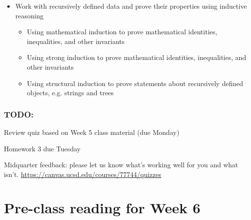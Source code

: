 \documentclass[12pt, oneside]{article}
\begin{document}
\begin{itemize}
\item Work with recursively defined data and prove their properties using inductive reasoning
\begin{itemize}
\item Using mathematical induction to prove mathematical identities, inequalities, and other invariants
\item Using strong induction to prove mathematical identities, inequalities, and other invariants
\item Using structural induction to prove statements about recursively defined objects, e.g. strings and trees
\end{itemize}
\end{itemize}

\subsubsection*{TODO:}
\begin{list}
   {\itemsep2pt}
    \item Review quiz based on Week 5 class material (due Monday)
    \item Homework 3 due Tuesday
    \item Midquarter feedback: please let us know what's working well for you and what isn't.  \url{https://canvas.ucsd.edu/courses/77744/quizzes}
\end{list}

\newpage


\section*{Pre-class reading for Week 6}
\end{document}
